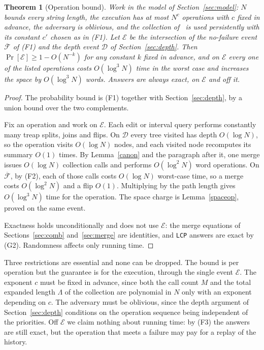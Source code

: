 ﻿\documentclass[11pt]{article}
\theoremstyle{plain}
\newtheorem{theorem}{Theorem}
\theoremstyle{remark}
\begin{document}
\begin{theorem}[Operation bound]\label{opbound}
Work in the model of Section~\ref{sec:model}: $N$ bounds every string length, the execution has at most $N^c$ operations with $c$ fixed in advance, the adversary is oblivious, and the collection of~\cite{GKK} is used persistently with its constant $c'$ chosen as in (F1). Let $\mathcal E$ be the intersection of the no-failure event $\overline{\mathcal F}$ of (F1) and the depth event $\mathcal D$ of Section~\ref{sec:depth}. Then $\Pr[\mathcal E]\ge1-O(N^{-k})$ for any constant $k$ fixed in advance, and on $\mathcal E$ every one of the listed operations costs $O(\log^3N)$ time in the worst case and increases the space by $O(\log^3N)$ words. Answers are always exact, on $\mathcal E$ and off it.
\end{theorem}
\begin{proof}
The probability bound is (F1) together with Section~\ref{sec:depth}, by a union bound over the two complements.

Fix an operation and work on $\mathcal E$. Each edit or interval query performs constantly many treap splits, joins and flips. On $\mathcal D$ every tree visited has depth $O(\log N)$, so the operation visits $O(\log N)$ nodes, and each visited node recomputes its summary $O(1)$ times. By Lemma~\ref{canon} and the paragraph after it, one merge issues $O(\log N)$ collection calls and performs $O(\log^2N)$ word operations. On $\overline{\mathcal F}$, by (F2), each of those calls costs $O(\log N)$ worst-case time, so a merge costs $O(\log^2N)$ and a flip $O(1)$. Multiplying by the path length gives $O(\log^3N)$ time for the operation. The space charge is Lemma~\ref{spaceop}, proved on the same event.

Exactness holds unconditionally and does not use $\mathcal E$: the merge equations of Sections~\ref{sec:comb} and~\ref{sec:merge} are identities, and \texttt{LCP} answers are exact by (G2). Randomness affects only running time.
\end{proof}
Three restrictions are essential and none can be dropped. The bound is per operation but the guarantee is for the execution, through the single event $\mathcal E$. The exponent $c$ must be fixed in advance, since both the call count $M$ and the total expanded length $\Lambda$ of the collection are polynomial in $N$ only with an exponent depending on $c$. The adversary must be oblivious, since the depth argument of Section~\ref{sec:depth} conditions on the operation sequence being independent of the priorities. Off $\mathcal E$ we claim nothing about running time: by (F3) the answers are still exact, but the operation that meets a failure may pay for a replay of the history.
\end{document}

